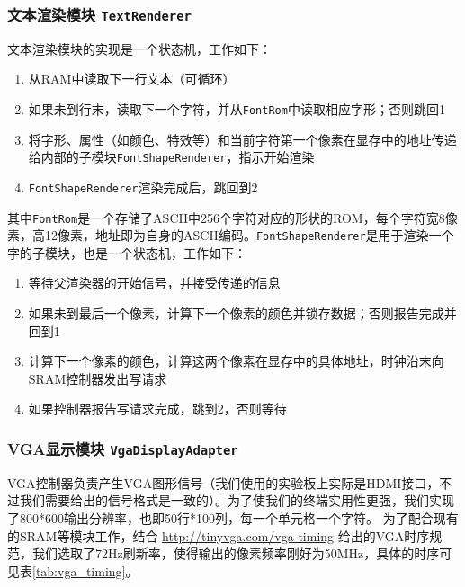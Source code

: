 \subsubsection{文本渲染模块 \texttt{TextRenderer}}
文本渲染模块的实现是一个状态机，工作如下：
\begin{enumerate}
  \item 从RAM中读取下一行文本（可循环）
  \item 如果未到行末，读取下一个字符，并从\texttt{FontRom}中读取相应字形；否则跳回1
  \item 将字形、属性（如颜色、特效等）和当前字符第一个像素在显存中的地址传递给内部的子模块\texttt{FontShapeRenderer}，指示开始渲染
  \item \texttt{FontShapeRenderer}渲染完成后，跳回到2
\end{enumerate}

其中\texttt{FontRom}是一个存储了ASCII中256个字符对应的形状的ROM，每个字符宽8像素，高12像素，地址即为自身的ASCII编码。\texttt{FontShapeRenderer}是用于渲染一个字的子模块，也是一个状态机，工作如下：
\begin{enumerate}
  \item 等待父渲染器的开始信号，并接受传递的信息
  \item 如果未到最后一个像素，计算下一个像素的颜色并锁存数据；否则报告完成并回到1
  \item 计算下一个像素的颜色，计算这两个像素在显存中的具体地址，时钟沿末向SRAM控制器发出写请求
  \item 如果控制器报告写请求完成，跳到2，否则等待
\end{enumerate}


\subsubsection{VGA显示模块 \texttt{VgaDisplayAdapter}}
VGA控制器负责产生VGA图形信号（我们使用的实验板上实际是HDMI接口，不过我们需要给出的信号格式是一致的）。为了使我们的终端实用性更强，我们实现了800*600输出分辨率，也即50行*100列，每一个单元格一个字符。
为了配合现有的SRAM等模块工作，结合 \url{http://tinyvga.com/vga-timing} 给出的VGA时序规范，我们选取了72Hz刷新率，使得输出的像素频率刚好为50MHz，具体的时序可见表\ref{tab:vga_timing}。

